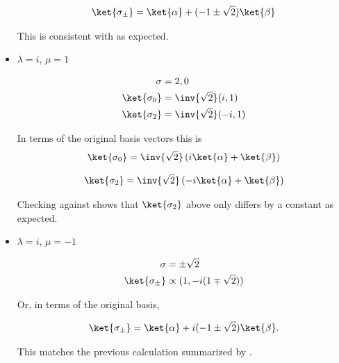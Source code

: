 \begin{itemize}
\begin{align}\label{eqn:desaiDiracNotes:73i}
\ket{\sigma_{\pm}} = \ket{\alpha} + (-1 \pm \sqrt{2}) \ket{\beta}
\end{align}

This is consistent with  as expected.

\item $\lambda = i$, $\mu = 1$

\begin{align}\label{eqn:desaiDiracNotes:74}
\sigma &= 2,0 \\
\ket{\sigma_0} &= \inv{\sqrt{2}} (i,1) \\
\ket{\sigma_2} &= \inv{\sqrt{2}} (-i,1) 
\end{align}

In terms of the original basis vectors this is 
\begin{align}\label{eqn:desaiDiracNotes:74i}
\ket{\sigma_0} = \inv{\sqrt{2}}\left( i\ket{\alpha} + \ket{\beta} \right)
\end{align}

\begin{align}\label{eqn:desaiDiracNotes:74ii}
\ket{\sigma_2} = \inv{\sqrt{2}}\left( -i\ket{\alpha} + \ket{\beta} \right)
\end{align}

Checking against  shows that $\ket{\sigma_2}$ above only differs by a constant as expected.

\item $\lambda = i$, $\mu = -1$

\begin{align}\label{eqn:desaiDiracNotes:75}
\sigma &= \pm \sqrt{2} \\
\ket{\sigma_{\pm}} &\propto (1, -i(1 \mp \sqrt{2}))
\end{align}

Or, in terms of the original basis,

\begin{align}\label{eqn:desaiDiracNotes:75i}
\ket{\sigma_{\pm}} = \ket{\alpha} + i (-1 \pm \sqrt{2}) \ket{\beta}.
\end{align}

This matches the previous calculation summarized by .

\end{itemize}
